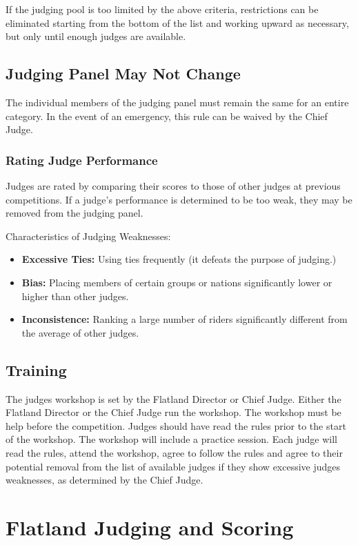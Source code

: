 If the judging pool is too limited by the above criteria, restrictions can be eliminated starting from the bottom of the list and working upward as necessary, but only until enough judges are available.

\subsection{Judging Panel May Not Change}

The individual members of the judging panel must remain the same for an entire category.
In the event of an emergency, this rule can be waived by the Chief Judge.

\subsubsection{Rating Judge Performance}
Judges are rated by comparing their scores to those of other judges at previous competitions.
If a judge’s performance is determined to be too weak, they may be removed from the judging panel.

Characteristics of Judging Weaknesses:
\begin{itemize}
\item \textbf{Excessive Ties:}
Using ties frequently (it defeats the purpose of judging.)
\item \textbf{Bias:}
Placing members of certain groups or nations significantly lower or higher than other judges.
\item\textbf{Inconsistence:}
Ranking a large number of riders significantly different from the average of other judges. 
\end{itemize}

\subsection{Training}
The judges workshop is set by the Flatland Director or Chief Judge.
Either the Flatland Director or the Chief Judge run the workshop.
The workshop must be help before the competition.
Judges should have read the rules prior to the start of the workshop.
The workshop will include a practice session.
Each judge will read the rules, attend the workshop,  agree to follow the rules and agree to their potential removal from the list of available judges if they show excessive judges weaknesses, as determined by the Chief Judge.

\section{Flatland Judging and Scoring}

